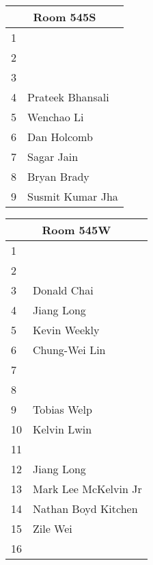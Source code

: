 \documentclass{article}
\begin{document}
\noindent
\begin{tabular}{|l|l|}
\hline
\multicolumn{2}{|c|}{Room 545S} \\ \hline\hline
1& \\
2& \\
3& \\
4&Prateek Bhansali\\
5&Wenchao Li\\
6&Dan Holcomb\\
7&Sagar Jain\\
8&Bryan Brady\\
9&Susmit Kumar Jha\\

\hline
\end{tabular}
\pagebreak

\noindent
\begin{tabular}{|l|l|}
\hline
\multicolumn{2}{|c|}{Room 545W} \\ \hline\hline
1& \\
2& \\
3&Donald Chai\\
4&Jiang Long\\
5&Kevin Weekly\\
6&Chung-Wei Lin\\
7& \\
8& \\
9&Tobias Welp\\
10&Kelvin Lwin\\
11& \\
12&Jiang Long\\
13&Mark Lee McKelvin Jr\\
14&Nathan Boyd Kitchen\\
15&Zile Wei\\
16& \\

\hline
\end{tabular}
\end{document}
